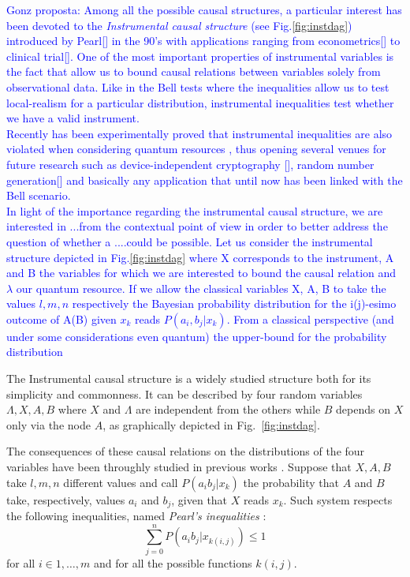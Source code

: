 \documentclass[
    nofootinbin,
    floatfix,
    amsfonts,
    twocolumn, 
    aps, 
    prl]{revtex4-1}
\begin{document}
\textcolor{blue}{Gonz proposta: Among all the possible causal structures, a particular interest has been devoted to the \textit{Instrumental causal structure} (see Fig.\ref{fig:instdag}) introduced by Pearl[] in the 90's with applications ranging from econometrics[] to clinical trial[]. One of the most important properties of instrumental variables is the fact that allow us to bound causal relations between variables solely from observational data. Like in the Bell tests where the inequalities allow us to test local-realism for a particular distribution, instrumental inequalities test whether we have a valid instrument.}\\
\textcolor{blue}{Recently has been experimentally proved that instrumental inequalities are also violated when considering quantum resources \cite{chaves2018}, thus opening several venues for future research such as device-independent cryptography [], random number generation[] and basically any application that until now has been linked with the Bell scenario.}\\

\textcolor{blue}{In light of the importance regarding the instrumental causal structure, we are interested in ...from the contextual point of view in order to better address the question of whether a ....could be possible.
Let us consider the instrumental structure depicted in Fig.\ref{fig:instdag} where X corresponds to the instrument, A and B the variables for which we are interested to bound the causal relation and $\lambda$ our quantum resource. If we allow the classical variables X, A, B to take the values $l,m,n$ respectively the Bayesian probability distribution for the i(j)-esimo outcome of A(B) given $x_k$ reads $P(a_i,b_j|x_k)$. From a classical perspective (and under some considerations even quantum) the upper-bound for the probability distribution}


The Instrumental causal structure is a widely studied
structure both for its simplicity and commonness.
It can be described by four random variables $\Lambda, X, A, B$ where $X$ and
$\Lambda$ are independent from the others while $B$ depends on $X$ only via the node $A$,
as graphically depicted in Fig.~\ref{fig:instdag}.

The consequences of these causal relations on the distributions of the four
variables have been throughly studied in previous works \cite{pearl1995,
bonet2001}.
Suppose that $X, A, B$ take $l,m,n$ different values and 
call $P(a_i b_j | x_k)$ the probability that $A$ and $B$ take, respectively, values $a_i$
and $b_j$, given that $X$ reads $x_k$.
Such system respects the following inequalities,
named \emph{Pearl's inequalities} \cite{pearl1995}:
\begin{equation} 
    \sum_{j=0}^{n} P(a_i b_j|x_{k(i,j)}) \le 1
    \label{eq:pearl_ineq}
\end{equation}
for all $i \in {1,\ldots, m}$ and for all the possible functions $k(i,j)$.
\end{document}
